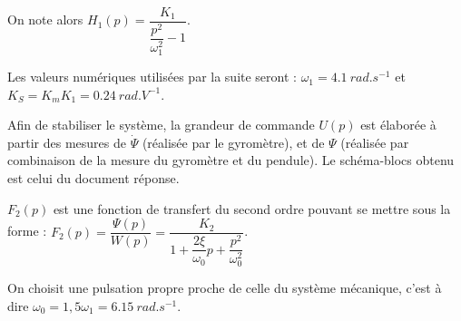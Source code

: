 \ifprof
\begin{corrige}
\end{corrige}
\else
\fi


On note alors $H_1(p)=\dfrac{K_1}{\dfrac{p^2}{\omega_1^2} - 1}$. 

Les valeurs numériques utilisées par la suite seront : $\omega_1=\SI{4,1}{rad.s^{-1}}$ et
$K_S = K_mK_1 = \SI{0,24}{rad.V^{-1}}$.

Afin de stabiliser le système, la grandeur de commande $U(p)$ est élaborée à partir des mesures de $\dot{\Psi}$ (réalisée par le gyromètre), et de $\Psi$ (réalisée par combinaison de la mesure du gyromètre et du pendule). Le schéma-blocs obtenu est celui du document réponse.


\ifprof
\begin{corrige}
\end{corrige}
\else
\fi



\ifprof
\begin{corrige}
\end{corrige}
\else
\fi

$F_2(p)$ est une fonction de transfert du second ordre pouvant se mettre sous la forme :
$F_2(p)=\dfrac{\Psi(p)}{W(p)}=\dfrac{K_2}{1+\dfrac{2\xi}{\omega_0}p+\dfrac{p^2}{\omega_0^2}}$.


\ifprof
\begin{corrige}
\end{corrige}
\else
\fi

On choisit une pulsation propre proche de celle du système mécanique, c’est
à dire $\omega_0 = 1,5\omega_1=\SI{6,15}{rad.s^{-1}}$.



\ifprof
\begin{corrige}
\end{corrige}
\else
\fi






